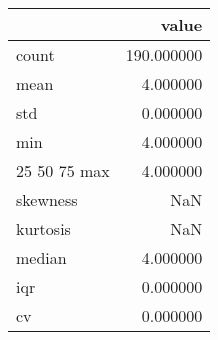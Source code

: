 \begin{tabular}{lr}
\toprule
 & value \\
\midrule
count & 190.000000 \\
mean & 4.000000 \\
std & 0.000000 \\
min & 4.000000 \\
25%
50%
75%
max & 4.000000 \\
skewness & NaN \\
kurtosis & NaN \\
median & 4.000000 \\
iqr & 0.000000 \\
cv & 0.000000 \\
\bottomrule
\end{tabular}
